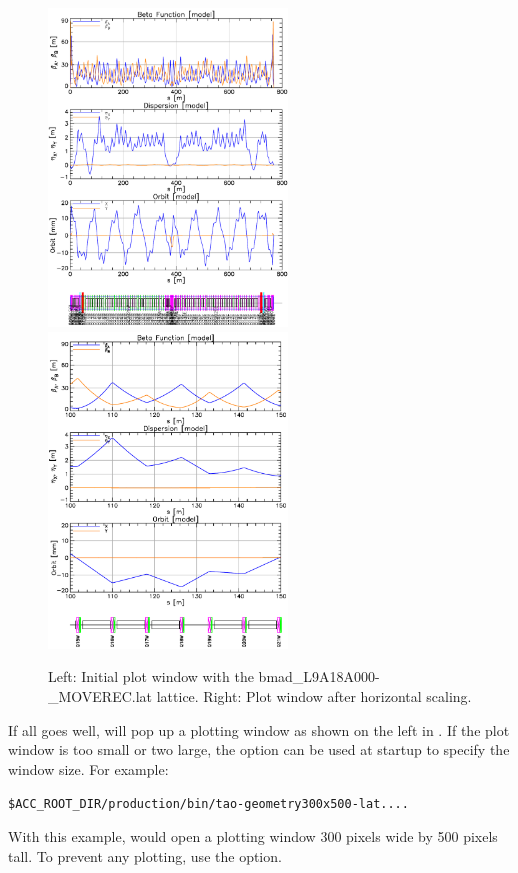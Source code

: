 \documentclass{hitec}
\newenvironment{display}
  {\vspace*{-1.5ex} \begin{alltt}}
  {\end{alltt} \vspace*{-1.0ex}}
\begin{document}
\begin{figure}[t]
\begin{centering}
\includegraphics[width=2.5in]{tao-start.pdf}
\hfil
\includegraphics[width=2.5in]{tao-x-scale.pdf}
\caption{Left: Initial \tao plot window with the bmad_L9A18A000-_MOVEREC.lat lattice.
Right: Plot window after horizontal scaling.}
\label{f:tao-start}
\end{centering}
\end{figure}

If all goes well, \tao will pop up a plotting window as shown on the left in
. If the plot window is too small or two large, the  option
can be used at startup to specify the window size. For example:
\begin{display}
  \$ACC_ROOT_DIR/production/bin/tao -geometry 300x500 -lat ....
\end{display}
With this example, \tao would open a plotting window 300 pixels wide by 500 pixels tall.
To prevent any plotting, use the  option.
\end{document}
